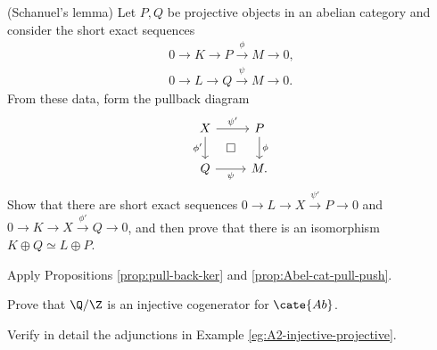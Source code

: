 \begin{Exercises}
	\item (Schanuel's lemma) Let $P,Q$ be projective objects in an abelian
	category and consider the short exact sequences
	\begin{gather*}
		0 \to K \to P \xrightarrow{\phi} M \to 0, \\
		0 \to L \to Q \xrightarrow{\psi} M \to 0.
	\end{gather*}
	From these data, form the pullback diagram
	\[\begin{tikzcd}
		X \arrow[r, "{\psi'}"] \arrow[d, "{\phi'}"'] & P \arrow[d, "\phi"] \\
		Q \arrow[r, "\psi"'] & M \arrow[phantom, lu, "\Box" description] .
	\end{tikzcd}\]
	Show that there are short exact sequences
	$0\to L\to X\xrightarrow{\psi'}P\to0$ and
	$0\to K\to X\xrightarrow{\phi'}Q\to0$, and then prove that there is an
	isomorphism $K\oplus Q\simeq L\oplus P$.
	\begin{hint} Apply Propositions \ref{prop:pull-back-ker} and
	\ref{prop:Abel-cat-pull-push}. \end{hint}

	\item Prove that $\Q/\Z$ is an injective cogenerator for $\cate{Ab}$.

	\item Verify in detail the adjunctions in Example
	\ref{eg:A2-injective-projective}.


\end{Exercises}
